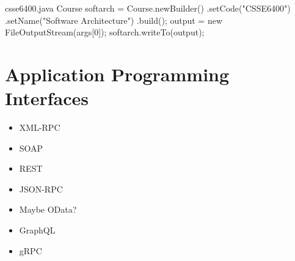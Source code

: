\documentclass{csse4400}
\begin{document}
\begin{code}[language=java]{csse6400.java}
Course softarch = Course.newBuilder()
    .setCode("CSSE6400")
    .setName("Software Architecture")
    .build();
output = new FileOutputStream(args[0]);
softarch.writeTo(output);
\end{code}

\section{Application Programming Interfaces}
\begin{itemize}
    \item XML-RPC
    \item SOAP
    \item REST
    \item JSON-RPC
    \item Maybe OData?
    \item GraphQL
    \item gRPC
\end{itemize}



\end{document}
